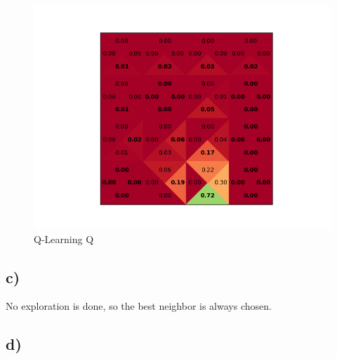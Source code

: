 \documentclass[a4paper]{article}
\begin{document}
\begin{figure}
	\centering
	\includegraphics[width=0.6\linewidth]{4x4_qlearn_q}
	\caption{Q-Learning Q}
	\label{fig:qlearnpolicy}
\end{figure}

\subsection*{c)}

No exploration is done, so the best neighbor is always chosen.

\subsection*{d)}
\end{document}
